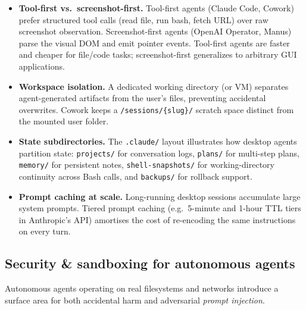 \begin{itemize}
  \item \textbf{Tool-first vs.\ screenshot-first.} Tool-first agents (Claude Code, Cowork)
    prefer structured tool calls (read file, run bash, fetch URL) over raw screenshot
    observation. Screenshot-first agents (OpenAI Operator, Manus) parse the visual DOM
    and emit pointer events. Tool-first agents are faster and cheaper for file/code tasks;
    screenshot-first generalizes to arbitrary GUI applications.

  \item \textbf{Workspace isolation.} A dedicated working directory (or VM) separates
    agent-generated artifacts from the user's files, preventing accidental overwrites.
    Cowork keeps a \texttt{/sessions/\{slug\}/} scratch space distinct from the mounted
    user folder.

  \item \textbf{State subdirectories.} The \texttt{.claude/} layout illustrates how
    desktop agents partition state: \texttt{projects/} for conversation logs,
    \texttt{plans/} for multi-step plans, \texttt{memory/} for persistent notes,
    \texttt{shell-snapshots/} for working-directory continuity across Bash calls, and
    \texttt{backups/} for rollback support.

  \item \textbf{Prompt caching at scale.} Long-running desktop sessions accumulate large
    system prompts. Tiered prompt caching (e.g.\ 5-minute and 1-hour TTL tiers in
    Anthropic's API) amortises the cost of re-encoding the same instructions on every
    turn.
\end{itemize}

\subsection{Security \& sandboxing for autonomous agents}

Autonomous agents operating on real filesystems and networks introduce a surface area for
both accidental harm and adversarial \emph{prompt injection}.

